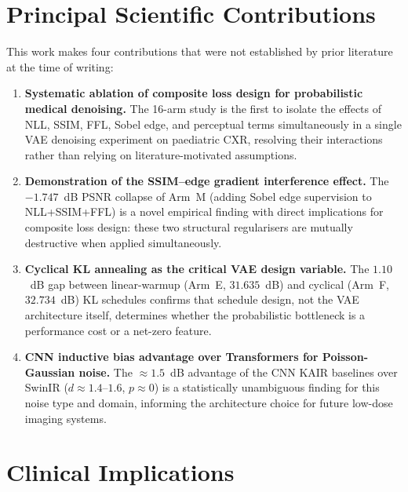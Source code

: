 \documentclass[12pt, a4paper, twoside, openright]{book}
\begin{document}
\section{Principal Scientific Contributions}
\label{sec:conc:sci}

This work makes four contributions that were not established by prior literature at the time of writing:

\begin{enumerate}
  \item \textbf{Systematic ablation of composite loss design for probabilistic medical denoising.} The 16-arm study is the first to isolate the effects of NLL, SSIM, FFL, Sobel edge, and perceptual terms simultaneously in a single VAE denoising experiment on paediatric CXR, resolving their interactions rather than relying on literature-motivated assumptions.

  \item \textbf{Demonstration of the SSIM--edge gradient interference effect.} The $-1.747$~dB PSNR collapse of Arm~M (adding Sobel edge supervision to NLL+SSIM+FFL) is a novel empirical finding with direct implications for composite loss design: these two structural regularisers are mutually destructive when applied simultaneously.

  \item \textbf{Cyclical KL annealing as the critical VAE design variable.} The $1.10$~dB gap between linear-warmup (Arm~E, $31.635$~dB) and cyclical (Arm~F, $32.734$~dB) KL schedules confirms that schedule design, not the VAE architecture itself, determines whether the probabilistic bottleneck is a performance cost or a net-zero feature.

  \item \textbf{CNN inductive bias advantage over Transformers for Poisson-Gaussian noise.} The $\approx 1.5$~dB advantage of the CNN KAIR baselines over SwinIR ($d \approx 1.4$--$1.6$, $p \approx 0$) is a statistically unambiguous finding for this noise type and domain, informing the architecture choice for future low-dose imaging systems.
\end{enumerate}

\section{Clinical Implications}
\label{sec:conc:clinical}
\end{document}
